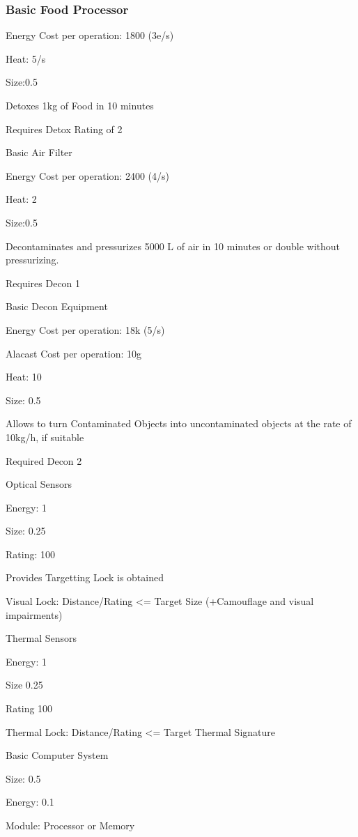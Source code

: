 \subsubsection{Basic Food Processor}\par
Energy Cost per operation: 1800 (3e/s)\par
Heat: 5/s \par
Size:0.5\par
Detoxes 1kg of Food in 10 minutes \par
Requires Detox Rating of 2\par
\par
Basic Air Filter\par
Energy Cost per operation: 2400 (4/s)\par
Heat: 2\par
Size:0.5\par
Decontaminates and pressurizes 5000 L of air in  10 minutes or double without pressurizing. \par
Requires Decon 1\par
\par
Basic Decon Equipment \par
Energy Cost per operation: 18k (5/s)\par
Alacast Cost per operation: 10g\par
Heat: 10 \par
Size: 0.5\par
Allows to turn Contaminated Objects into uncontaminated objects at the rate of 10kg/h, if suitable\par
Required Decon 2\par
\par
Optical Sensors\par
Energy: 1\par
Size: 0.25 \par
Rating: 100\par
Provides Targetting Lock is obtained\par
Visual Lock: Distance/Rating <= Target Size (+Camouflage and visual impairments)\par
\par
Thermal Sensors\par
Energy: 1\par
Size 0.25\par
Rating 100\par
Thermal Lock: Distance/Rating <= Target Thermal Signature\par
\par
Basic Computer System\par
Size: 0.5\par
Energy: 0.1\par
Module: Processor or Memory\par
\par

